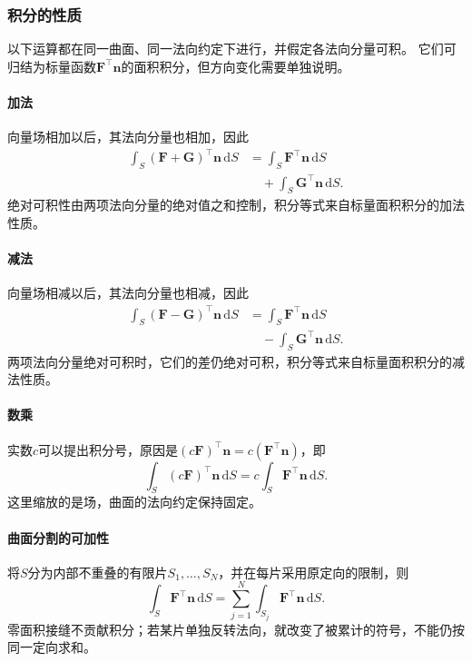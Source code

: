\subsubsection{积分的性质}

以下运算都在同一曲面、同一法向约定下进行，并假定各法向分量可积。
它们可归结为标量函数$\bm F^\top\bm n$的面积积分，但方向变化需要单独说明。

\paragraph{加法}

向量场相加以后，其法向分量也相加，因此
\[
 \begin{aligned}
 \int_S(\bm F+\bm G)^\top\bm n\,\mathrm dS
 &=\int_S\bm F^\top\bm n\,\mathrm dS\\
 &\quad{}+\int_S\bm G^\top\bm n\,\mathrm dS.
 \end{aligned}
\]
绝对可积性由两项法向分量的绝对值之和控制，积分等式来自标量面积积分的加法性质。

\paragraph{减法}

向量场相减以后，其法向分量也相减，因此
\[
 \begin{aligned}
 \int_S(\bm F-\bm G)^\top\bm n\,\mathrm dS
 &=\int_S\bm F^\top\bm n\,\mathrm dS\\
 &\quad{}-\int_S\bm G^\top\bm n\,\mathrm dS.
 \end{aligned}
\]
两项法向分量绝对可积时，它们的差仍绝对可积，积分等式来自标量面积积分的减法性质。

\paragraph{数乘}

实数$c$可以提出积分号，原因是$(c\bm F)^\top\bm n=c(\bm F^\top\bm n)$，即
\[
 \int_S(c\bm F)^\top\bm n\,\mathrm dS
 =c\int_S\bm F^\top\bm n\,\mathrm dS.
\]
这里缩放的是场，曲面的法向约定保持固定。

\paragraph{曲面分割的可加性}

将$S$分为内部不重叠的有限片$S_1,\ldots,S_N$，并在每片采用原定向的限制，则
\[
 \int_S\bm F^\top\bm n\,\mathrm dS
 =\sum_{j=1}^N\int_{S_j}\bm F^\top\bm n\,\mathrm dS.
\]
零面积接缝不贡献积分；若某片单独反转法向，就改变了被累计的符号，不能仍按同一定向求和。

